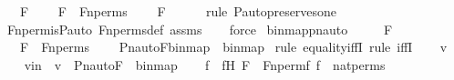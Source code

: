 \begin{isabellebody}
\ \ \ F\ \isanewline
\ \ \ {\isachardoublequoteopen}F\ {\isasymin}\ Fn{\isacharunderscore}{\kern0pt}perms{\isachardoublequoteclose}\ \isanewline
\ \ \ {\isachardoublequoteopen}F{\isacharbackquote}{\kern0pt}{}\ {\isacharequal}{\kern0pt}\ {}{\isachardoublequoteclose}\ \isanewline
%
\isadelimproof
\ \ %
\endisadelimproof
%
\isatagproof
{}\isamarkupfalse%
{\isacharparenleft}{\kern0pt}rule\ P{\isacharunderscore}{\kern0pt}auto{\isacharunderscore}{\kern0pt}preserves{\isacharunderscore}{\kern0pt}one{\isacharparenright}{\kern0pt}\isanewline
\ \ \isamarkupfalse%
\ Fn{\isacharunderscore}{\kern0pt}perm{\isacharprime}{\kern0pt}{\isacharunderscore}{\kern0pt}is{\isacharunderscore}{\kern0pt}P{\isacharunderscore}{\kern0pt}auto\ Fn{\isacharunderscore}{\kern0pt}perms{\isacharunderscore}{\kern0pt}def\ assms\isanewline
\ \ \isamarkupfalse%
\ force%
\endisatagproof
{\isafoldproof}%
%
\isadelimproof
\isanewline
%
\endisadelimproof
\isanewline
{}\isamarkupfalse%
\ binmap{\isacharprime}{\kern0pt}{\isacharunderscore}{\kern0pt}pnauto\ {\isacharcolon}{\kern0pt}\ \isanewline
\ \ \ F\ \isanewline
\ \ \ {\isachardoublequoteopen}F\ {\isasymin}\ Fn{\isacharunderscore}{\kern0pt}perms{\isachardoublequoteclose}\ \isanewline
\ \ \ {\isachardoublequoteopen}Pn{\isacharunderscore}{\kern0pt}auto{\isacharparenleft}{\kern0pt}F{\isacharparenright}{\kern0pt}{\isacharbackquote}{\kern0pt}binmap{\isacharprime}{\kern0pt}\ {\isacharequal}{\kern0pt}\ binmap{\isacharprime}{\kern0pt}{\isachardoublequoteclose}\ \isanewline
%
\isadelimproof
%
\endisadelimproof
%
\isatagproof
{}\isamarkupfalse%
{\isacharparenleft}{\kern0pt}rule\ equality{\isacharunderscore}{\kern0pt}iffI{\isacharcomma}{\kern0pt}\ rule\ iffI{\isacharparenright}{\kern0pt}\isanewline
\ \ \isamarkupfalse%
\ v\ \isanewline
\ \ \isamarkupfalse%
\ vin\ {\isacharcolon}{\kern0pt}\ {\isachardoublequoteopen}v\ {\isasymin}\ Pn{\isacharunderscore}{\kern0pt}auto{\isacharparenleft}{\kern0pt}F{\isacharparenright}{\kern0pt}\ {\isacharbackquote}{\kern0pt}\ binmap{\isacharprime}{\kern0pt}{\isachardoublequoteclose}\isanewline
\isanewline
\ \ \isamarkupfalse%
\ f\ \ fH{\isacharcolon}{\kern0pt}\ {\isachardoublequoteopen}F\ {\isacharequal}{\kern0pt}\ Fn{\isacharunderscore}{\kern0pt}perm{\isacharprime}{\kern0pt}{\isacharparenleft}{\kern0pt}f{\isacharparenright}{\kern0pt}{\isachardoublequoteclose}\ {\isachardoublequoteopen}f\ {\isasymin}\ nat{\isacharunderscore}{\kern0pt}perms{\isachardoublequoteclose}\ \isamarkupfalse%

\end{isabellebody}
